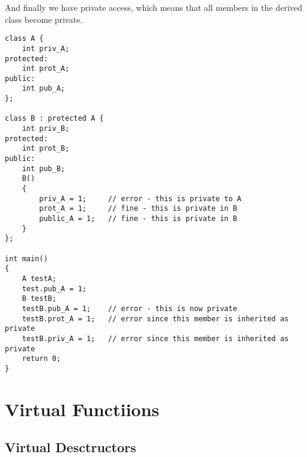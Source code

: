 And finally we have private access, which means that all members in the derived class become private. 
\begin{lstlisting}
class A {
	int priv_A;
protected:
	int prot_A;
public:
	int pub_A;
};

class B : protected A {
	int priv_B;
protected:
	int prot_B;
public:
	int pub_B;
	B() 
	{
		priv_A = 1; 	// error - this is private to A
		prot_A = 1; 	// fine - this is private in B
		public_A = 1; 	// fine - this is private in B
	}
};

int main()
{
	A testA;
	test.pub_A = 1;
	B testB;
	testB.pub_A = 1; 	// error - this is now private
	testB.prot_A = 1;	// error since this member is inherited as private
	testB.priv_A = 1;	// error since this member is inherited as private
	return 0;
}	
\end{lstlisting}


\section{Virtual Functiions}

\subsection{Virtual Desctructors}

